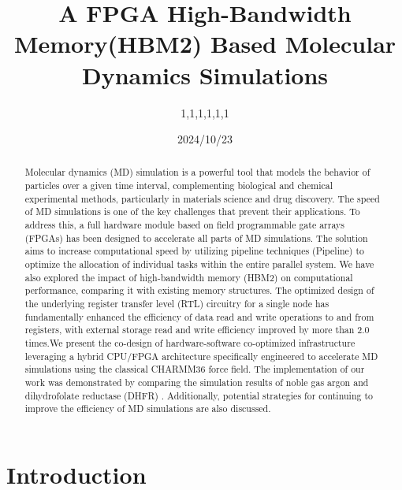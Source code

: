\documentclass{article}
\title{
	\textbf{
		A FPGA High-Bandwidth Memory(HBM2) Based Molecular Dynamics Simulations 
    }}
\author{1,1,1,1,1,1}
\date{2024/10/23}
\begin{document}
\maketitle

%
%
\begin{abstract}

\noindent
Molecular dynamics (MD) simulation is a powerful tool that models the behavior 
of particles over a given time interval, complementing biological and chemical 
experimental methods, particularly in materials science and drug discovery.
The speed of MD simulations is one of the key challenges that prevent their 
applications. 
To address this, a full hardware module based on field programmable gate 
arrays (FPGAs) has been designed to accelerate all parts of MD simulations. 
The solution aims to increase computational speed by utilizing pipeline 
techniques (Pipeline) to optimize the allocation of individual tasks within 
the entire parallel system.
We have also explored the impact of high-bandwidth memory (HBM2) on 
computational performance, comparing it with existing memory structures.
The optimized design of the underlying register transfer level (RTL) circuitry 
for a single node has fundamentally enhanced the efficiency of data read and 
write operations to and from registers, with external storage read and write 
efficiency improved by more than 2.0 times.We present the co-design of 
hardware-software co-optimized infrastructure leveraging a hybrid 
CPU/FPGA architecture specifically engineered to accelerate 
MD simulations using the classical CHARMM36 force field.
The implementation of our work was demonstrated by comparing the simulation 
results of noble gas argon and dihydrofolate reductase (DHFR) .
Additionally, potential strategies for continuing to improve the efficiency of 
MD simulations are also discussed.

\end{abstract}

\section{Introduction}
\end{document}
